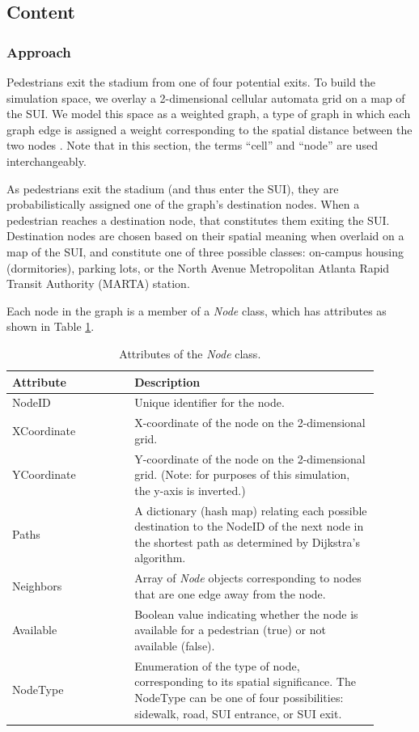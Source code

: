 \documentclass[12pt]{article}
\begin{document}
\subsection{Content}

\subsubsection{Approach}
Pedestrians exit the stadium from one of four potential exits. To build the
simulation space, we overlay a 2-dimensional cellular automata grid on a map of
the SUI. We model this space as a weighted graph, a type of graph in which each
graph edge is assigned a weight corresponding to the spatial distance between
the two nodes \cite{west2001introduction}. Note that in this
section, the terms ``cell'' and ``node'' are used interchangeably.

As pedestrians exit the stadium (and thus enter the SUI), they are
probabilistically assigned one of the graph’s destination nodes.  When a
pedestrian reaches a destination node, that constitutes them exiting the SUI.
Destination nodes are chosen based on their spatial meaning when overlaid on a
map of the SUI, and constitute one of three possible classes: on-campus housing
(dormitories), parking lots, or the North Avenue Metropolitan Atlanta Rapid
Transit Authority (MARTA) station.

Each node in the graph is a member of a \textit{Node} class, which
has attributes as shown in Table \ref{table:node}.

\def\arraystretch{1.5}
\begin{table}[hb!]
  \centering
    \begin{tabular}{p{0.3\linewidth}p{0.6\linewidth}}
     \hline
     Attribute & Description \\
     \hline
     NodeID      & Unique identifier for the node. \\
     XCoordinate & X-coordinate of the node on the 2-dimensional grid. \\
     YCoordinate & Y-coordinate of the node on the 2-dimensional grid.
                   (Note: for purposes of this simulation, the y-axis is
                    inverted.) \\
     Paths       & A dictionary (hash map) relating each possible destination
                   to the NodeID of the next node in the shortest path as
                   determined by Dijkstra's algorithm. \\
     Neighbors & Array of \textit{Node} objects corresponding to nodes that are
                 one edge away from the node. \\
     Available	& Boolean value indicating whether the node is available for a
                  pedestrian (true) or not available (false). \\
     NodeType   & Enumeration of the type of node, corresponding to its
                  spatial significance. The NodeType can be one of four
                  possibilities: sidewalk, road, SUI entrance, or SUI exit. \\
     \hline
    \end{tabular}
    \caption{Attributes of the \textit{Node} class.}
  \label{table:node}
\end{table}
\end{document}
